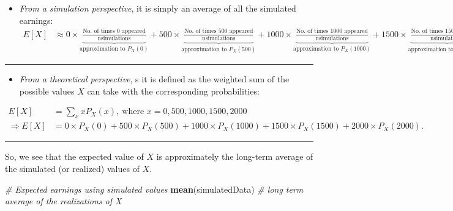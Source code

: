 \documentclass[
]{article}
\newenvironment{Shaded}{\begin{snugshade}}{\end{snugshade}}
\newcommand{\CommentTok}[1]{\textcolor[rgb]{0.56,0.35,0.01}{\textit{#1}}}
\newcommand{\FunctionTok}[1]{\textcolor[rgb]{0.13,0.29,0.53}{\textbf{#1}}}
\newcommand{\NormalTok}[1]{#1}
\providecommand{\tightlist}{%
  \setlength{\itemsep}{0pt}\setlength{\parskip}{0pt}}
\begin{document}
\begin{itemize}
\tightlist
\item
  \emph{From a simulation perspective}, it is simply an average of all
  the simulated earnings:
  \(\begin{align*}E[X] &\approx 0 \times\underbrace{\frac{\text{No. of times 0 appeared}}{\text{nsimulations}}}_{\text{approximation to }P_X(0)}+500 \times\underbrace{\frac{\text{No. of times 500 appeared}}{\text{nsimulations}}}_{\text{approximation to }P_X(500)}+1000 \times\underbrace{\frac{\text{No. of times 1000 appeared}}{\text{nsimulations}}}_{\text{approximation to }P_X(1000)}+1500 \times\underbrace{\frac{\text{No. of times 1500 appeared}}{\text{nsimulations}}}_{\text{approximation to }P_X(1500)}+2000 \times\underbrace{\frac{\text{No. of times 2000 appeared}}{\text{nsimulations}}}_{\text{approximation to }P_X(2000)}.\end{align*}\)
\end{itemize}

\begin{center}\rule{0.5\linewidth}{0.5pt}\end{center}

\begin{itemize}
\tightlist
\item
  \emph{From a theoretical perspective}, s it is defined as the weighted
  sum of the possible values \(X\) can take with the corresponding
  probabilities:
\end{itemize}

\(\begin{align*} E[X] &= \sum_xxP_X(x),\ \text{where }x = 0, 500, 1000, 1500, 2000\\\Rightarrow E[X] &= 0\times P_X(0)+500\times P_X(500)+1000\times P_X(1000)+1500\times P_X(1500)+2000\times P_X(2000).\end{align*}\)

\begin{center}\rule{0.5\linewidth}{0.5pt}\end{center}

So, we see that the expected value of \(X\) is approximately the
long-term average of the simulated (or realized) values of \(X.\)

\begin{Shaded}
\begin{Highlighting}[]
\CommentTok{\# Expected earnings using simulated values}
\FunctionTok{mean}\NormalTok{(simulatedData) }\CommentTok{\# long term average of the realizations of X}
\end{Highlighting}
\end{Shaded}
\end{document}
